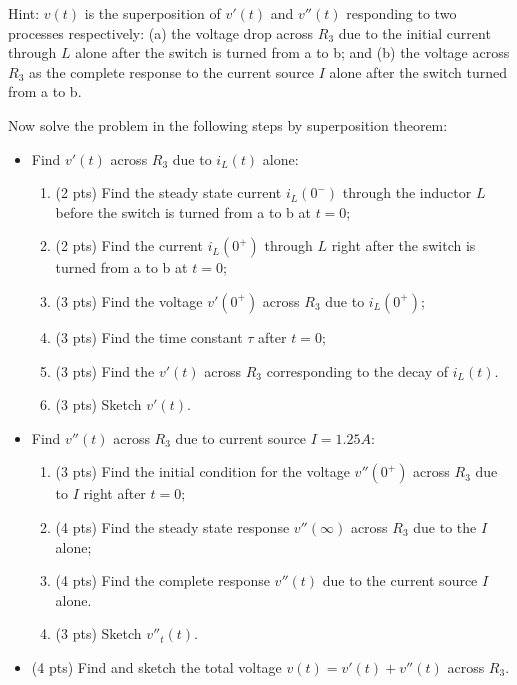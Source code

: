 \begin{itemize}
Hint: $v(t)$ is the superposition of $v'(t)$ and $v''(t)$ responding to two processes
respectively:
(a) the voltage drop across $R_3$ due to the initial current through $L$ alone after
the switch is turned from a to b; and (b) the voltage across $R_3$ as the complete 
response to the current source $I$ alone after the switch turned from a to b.


Now solve the problem in the following steps by superposition theorem:
\begin{itemize}
  \item Find $v'(t)$ across $R_3$ due to $i_L(t)$ alone:
    \begin{enumerate}
    \item (2 pts) Find the steady state current $i_L(0^-)$ through the inductor $L$ 
      before the switch is turned from a to b at $t=0$;
    \item (2 pts) Find the current $i_L(0^+)$ through $L$ right after the switch is 
      turned from a to b at $t=0$;
    \item (3 pts) Find the voltage $v'(0^+)$ across $R_3$ due to $i_L(0^+)$;
    \item (3 pts) Find the time constant $\tau$ after $t=0$;
    \item (3 pts) Find the $v'(t)$ across $R_3$ corresponding to the decay of
      $i_L(t)$.
    \item (3 pts) Sketch $v'(t)$.
    \end{enumerate}
  \item Find $v''(t)$ across $R_3$ due to current source $I=1.25 A$:
    \begin{enumerate}
    \item (3 pts) Find the initial condition for the voltage $v''(0^+)$ across 
      $R_3$ due to $I$ right after $t=0$;
    \item (4 pts) Find the steady state response $v''(\infty)$ across $R_3$ due 
      to the $I$ alone;
    \item (4 pts) Find the complete response $v''(t)$ due to the current source
      $I$ alone.
    \item (3 pts) Sketch $v''_t(t)$.
    \end{enumerate}
  \item (4 pts) Find and sketch the total voltage $v(t)=v'(t)+v''(t)$ across $R_3$.
\end{itemize}



\end{itemize}

